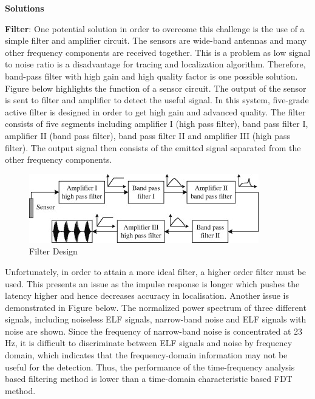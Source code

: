 \documentclass[11pt]{article}		%
\begin{document}
		\textbf{Solutions}
		
		\textbf{Filter}:
        One potential solution in order to overcome this challenge is the use of a simple filter and amplifier circuit. The sensors are wide-band antennas and many other frequency components are received together. This is a problem as low signal to noise ratio is a disadvantage for tracing and localization algorithm. Therefore, band-pass filter with high gain and high quality factor is one possible solution.\\
        \hspace*{3ex}Figure below highlights the function of a sensor circuit. The output of the sensor is sent to filter and amplifier to detect the useful signal. In this system, five-grade active filter is designed in order to get high gain and advanced quality. The filter consists of five segments including amplifier I (high pass filter), band pass filter I, amplifier II (band pass filter), band pass filter II and amplifier III (high pass filter). The output signal then consists of the emitted signal separated from the other frequency components. 
        
        \begin{figure}[h]
			\centering
			\includegraphics[scale=1.5]{Filtering.jpg}
			\caption{Filter Design}
			\label{comparisonComms}
		\end{figure}
		
		Unfortunately, in order to attain a more ideal filter, a higher order filter must be used. This presents an issue as the impulse response is longer which pushes the latency higher and hence decreases accuracy in localisation. Another issue is demonstrated in Figure below. The normalized power spectrum of three different signals, including noiseless ELF signals, narrow-band noise and ELF signals with noise are shown. Since the frequency of narrow-band noise is concentrated at 23 Hz, it is difficult to discriminate between ELF signals and noise by frequency domain, which indicates that the frequency-domain information may not be useful for the detection. Thus, the performance of the time-frequency analysis based filtering method is lower than a time-domain characteristic based FDT method.
\end{document}
